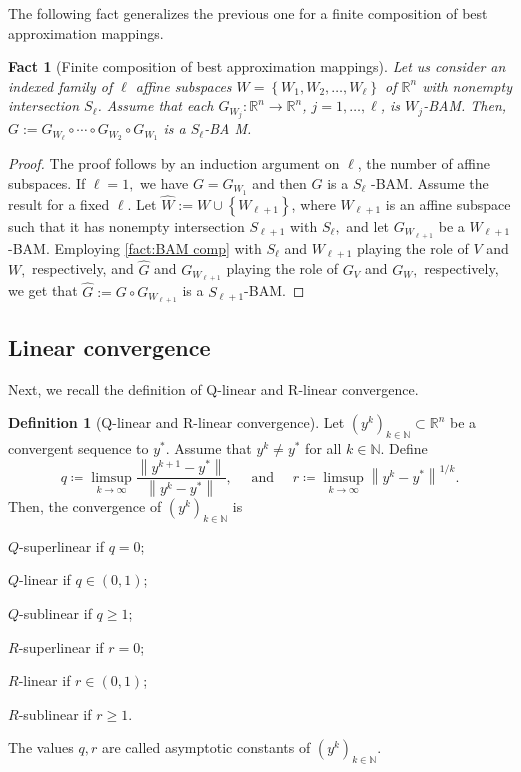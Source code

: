 \documentclass[smallextended,numbook,nospthms]{svjour3}
\theoremstyle{plain}
\newtheorem{fact}[theorem]{Fact}
\theoremstyle{definition}
\newtheorem{definition}[theorem]{Definition}
\def\RR{\mathds R}
\def\NN{\mathds N}
\begin{document}
The following fact generalizes the previous one for a finite composition of best approximation mappings.
\begin{fact}[Finite composition of best approximation mappings]\label{fact:BAM comp finite}
	Let us consider an indexed family of $\ell$ affine subspaces $W=\left\{W_{1}, W_{2}, \ldots, W_{\ell}\right\}$ of $\RR^{n}$ with nonempty intersection $S_{\ell}$. Assume that each $G_{W_{j}}: \RR^{n} \rightarrow \RR^{n}$, $j=1, \ldots, \ell$,
	is $W_{j}$-BAM. Then, $G:=G_{W_{\ell}} \circ \cdots \circ G_{W_{2}} \circ G_{W_{1}}$ is a $S_{\ell}$-BA M.
\end{fact}
\begin{proof}
	The proof follows by an induction argument on $\ell$, the number of affine subspaces.
	If $\ell=1,$ we have $G=G_{W_{1}}$ and then $G$ is a $S_{\ell}$ -BAM.
	Assume the result for a fixed $\ell$. Let $\widehat{W}:=W \cup\left\{W_{\ell+1}\right\}$, where $W_{\ell+1}$ is an affine subspace such that it has nonempty intersection $S_{\ell+1}$ with $S_{\ell},$ and let $G_{W_{\ell+1}}$ be a $W_{\ell+1}$ -BAM. Employing \cref{fact:BAM comp} with $S_{\ell}$ and $W_{\ell+1}$ playing the role of $V$ and $W,$ respectively, and $\widehat{G}$ and $G_{W_{\ell+1}}$ playing the role of $G_{V}$ and $G_{W},$ respectively, we get that $\widehat{G}:=G \circ G_{W_{\ell+1}}$ is a $S_{\ell+1}$-BAM.
\end{proof}

\subsection{Linear convergence}
Next, we recall the definition of Q-linear and R-linear convergence.
\begin{definition}[Q-linear and R-linear convergence]\label{def:QR conv}
	Let $\left(y^{k}\right)_{k \in \NN} \subset \RR^{n}$ be a convergent sequence to $y^{*} .$ Assume that $y^{k} \neq y^{*}$ for all $k \in \NN$. Define
	$$
	q\coloneqq \limsup _{k \rightarrow \infty} \frac{\left\|y^{k+1}-y^{*}\right\|}{\left\|y^{k}-y^{*}\right\|}, \quad \text { and } \quad r\coloneqq \limsup _{k \rightarrow \infty}\left\|y^{k}-y^{*}\right\|^{1 / k}.
	$$
	Then, the convergence of $\left(y^{k}\right)_{k \in \NN}$ is
	\begin{listi}
		\item $Q$-superlinear if $q = 0$;
		\item  $Q$-linear if $q \in(0,1)$; 
		\item  $Q$-sublinear if $q \geq 1$;
		\item  $R$-superlinear if $r=0$;
		\item $R$-linear if $r \in(0,1)$; 
		\item  $R$-sublinear if $r \geq 1$.
	\end{listi}
	The values $q, r$ are called asymptotic constants of $\left(y^{k}\right)_{k \in \NN}$.
\end{definition}
\end{document}
